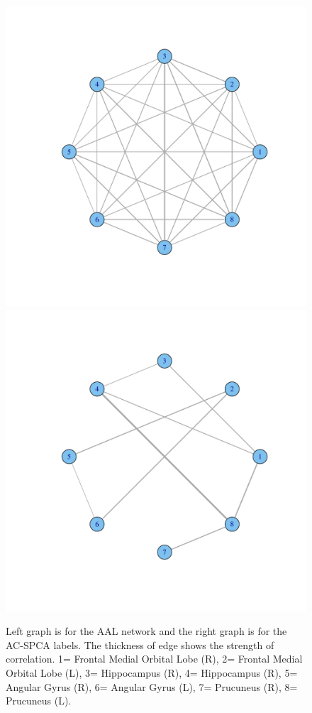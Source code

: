 \documentclass{llncs}
\begin{document}
\begin{figure}
\begin{center}
\includegraphics[width=0.45\linewidth]{graphaal.pdf} 
\includegraphics[width=0.45\linewidth]{graphacspca.pdf} 
\end{center}
\vspace{-0.2in}
\caption{Left graph is for the AAL network and the right graph is for the AC-SPCA labels. The thickness of edge shows the strength of correlation. 1= Frontal Medial Orbital Lobe (R), 2= Frontal Medial Orbital Lobe (L), 3= Hippocampus (R), 4= Hippocampus (R), 5= Angular Gyrus (R), 6= Angular Gyrus (L), 7= Prucuneus (R), 8= Prucuneus (L).   }
\label{networksi}
\end{figure}


\end{document}
